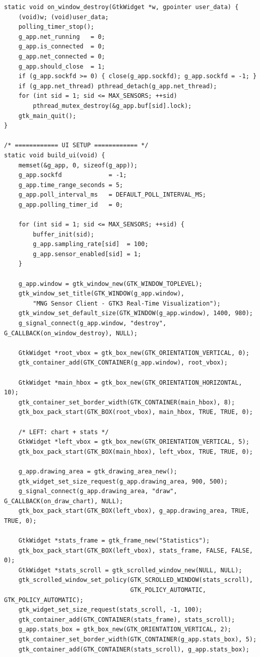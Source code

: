 \begin{verbatim}
static void on_window_destroy(GtkWidget *w, gpointer user_data) {
    (void)w; (void)user_data;
    polling_timer_stop();
    g_app.net_running   = 0;
    g_app.is_connected  = 0;
    g_app.net_connected = 0;
    g_app.should_close  = 1;
    if (g_app.sockfd >= 0) { close(g_app.sockfd); g_app.sockfd = -1; }
    if (g_app.net_thread) pthread_detach(g_app.net_thread);
    for (int sid = 1; sid <= MAX_SENSORS; ++sid)
        pthread_mutex_destroy(&g_app.buf[sid].lock);
    gtk_main_quit();
}

/* ============ UI SETUP ============ */
static void build_ui(void) {
    memset(&g_app, 0, sizeof(g_app));
    g_app.sockfd             = -1;
    g_app.time_range_seconds = 5;
    g_app.poll_interval_ms   = DEFAULT_POLL_INTERVAL_MS;
    g_app.polling_timer_id   = 0;

    for (int sid = 1; sid <= MAX_SENSORS; ++sid) {
        buffer_init(sid);
        g_app.sampling_rate[sid]  = 100;
        g_app.sensor_enabled[sid] = 1;
    }

    g_app.window = gtk_window_new(GTK_WINDOW_TOPLEVEL);
    gtk_window_set_title(GTK_WINDOW(g_app.window),
        "MNG Sensor Client - GTK3 Real-Time Visualization");
    gtk_window_set_default_size(GTK_WINDOW(g_app.window), 1400, 980);
    g_signal_connect(g_app.window, "destroy", G_CALLBACK(on_window_destroy), NULL);

    GtkWidget *root_vbox = gtk_box_new(GTK_ORIENTATION_VERTICAL, 0);
    gtk_container_add(GTK_CONTAINER(g_app.window), root_vbox);

    GtkWidget *main_hbox = gtk_box_new(GTK_ORIENTATION_HORIZONTAL, 10);
    gtk_container_set_border_width(GTK_CONTAINER(main_hbox), 8);
    gtk_box_pack_start(GTK_BOX(root_vbox), main_hbox, TRUE, TRUE, 0);

    /* LEFT: chart + stats */
    GtkWidget *left_vbox = gtk_box_new(GTK_ORIENTATION_VERTICAL, 5);
    gtk_box_pack_start(GTK_BOX(main_hbox), left_vbox, TRUE, TRUE, 0);

    g_app.drawing_area = gtk_drawing_area_new();
    gtk_widget_set_size_request(g_app.drawing_area, 900, 500);
    g_signal_connect(g_app.drawing_area, "draw", G_CALLBACK(on_draw_chart), NULL);
    gtk_box_pack_start(GTK_BOX(left_vbox), g_app.drawing_area, TRUE, TRUE, 0);

    GtkWidget *stats_frame = gtk_frame_new("Statistics");
    gtk_box_pack_start(GTK_BOX(left_vbox), stats_frame, FALSE, FALSE, 0);
    GtkWidget *stats_scroll = gtk_scrolled_window_new(NULL, NULL);
    gtk_scrolled_window_set_policy(GTK_SCROLLED_WINDOW(stats_scroll),
                                   GTK_POLICY_AUTOMATIC, GTK_POLICY_AUTOMATIC);
    gtk_widget_set_size_request(stats_scroll, -1, 100);
    gtk_container_add(GTK_CONTAINER(stats_frame), stats_scroll);
    g_app.stats_box = gtk_box_new(GTK_ORIENTATION_VERTICAL, 2);
    gtk_container_set_border_width(GTK_CONTAINER(g_app.stats_box), 5);
    gtk_container_add(GTK_CONTAINER(stats_scroll), g_app.stats_box);


\end{verbatim}

